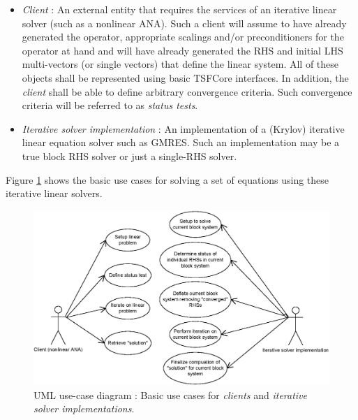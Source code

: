 \documentclass[pdf,ps2pdf,11pt]{SANDreport}
\begin{document}
\begin{itemize}

\item{}\textit{Client} :
An external entity that requires the services of an iterative linear
solver (such as a nonlinear ANA).  Such a client will assume to have
already generated the operator, appropriate scalings and/or
preconditioners for the operator at hand and will have already
generated the RHS and initial LHS multi-vectors (or single vectors)
that define the linear system.  All of these objects shall be
represented using basic TSFCore interfaces.  In addition, the
{}\textit{client} shall be able to define arbitrary convergence
criteria.  Such convergence criteria will be referred to as
{}\textit{status tests}.

\item{}\textit{Iterative solver implementation} : 
An implementation of a (Krylov) iterative linear equation solver such
as GMRES.  Such an implementation may be a true block RHS solver or
just a single-RHS solver.

\end{itemize}

Figure {}\ref{belos:fig:BelosUseCases} shows the basic use cases for
solving a set of equations using these iterative linear solvers.

{\bsinglespace
\begin{figure}[t]
\begin{center}
\includegraphics*[scale=0.85]{BelosUseCases}
\end{center}
\caption{
\label{belos:fig:BelosUseCases}
UML use-case diagram : Basic use cases
for {}\textit{clients} and {}\textit{iterative solver implementations}.}
\end{figure}
\esinglespace}
\end{document}
